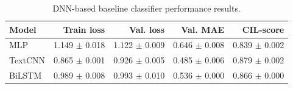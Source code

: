 \begin{table}[htbp]
\centering
\small
\caption{DNN-based baseline classifier performance results.}
\label{tab:dnn-baselines}
\begin{tabular}{lrrrr}
\toprule
Model & Train loss & Val. loss & Val. MAE & CIL-score \\
\midrule
MLP & 1.149 $\pm$ 0.018 & 1.122 $\pm$ 0.009 & 0.646 $\pm$ 0.008 & 0.839 $\pm$ 0.002 \\
TextCNN & 0.865 $\pm$ 0.001 & 0.926 $\pm$ 0.005 & 0.485 $\pm$ 0.006 & 0.879 $\pm$ 0.002 \\
BiLSTM & 0.989 $\pm$ 0.008 & 0.993 $\pm$ 0.010 & 0.536 $\pm$ 0.000 & 0.866 $\pm$ 0.000 \\
\bottomrule
\end{tabular}
\end{table}
